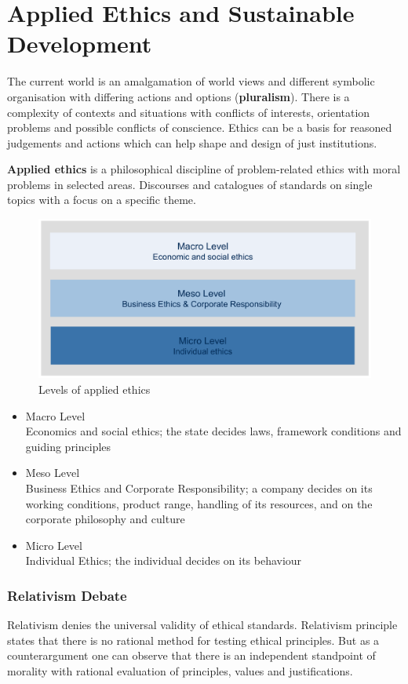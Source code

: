\documentclass[11pt]{article}
\theoremstyle{definition}
\begin{document}
\clearpage
\section{Applied Ethics and Sustainable Development}
The current world is an amalgamation of world views and different symbolic organisation with differing actions and options (\textbf{pluralism}). There is a complexity of contexts and situations with conflicts of interests, orientation problems and possible conflicts of conscience. Ethics can be a basis for reasoned judgements and actions which can help shape and design of just institutions.

\begin{definition}
	\textbf{Applied ethics} is a philosophical discipline of problem-related ethics with moral problems in selected areas. Discourses and catalogues of standards on single topics with a focus on a specific theme.
\end{definition}

\begin{figure}[tbh]
	\centering
	\includegraphics[width=0.6\linewidth]{img/applied_ethics_level}
	\caption{Levels of applied ethics}
	\label{fig:appliedethicslevel}
\end{figure}

\begin{itemize}
	\item Macro Level\\Economics and social ethics; the state decides laws, framework conditions and guiding principles
	\item Meso Level\\Business Ethics and Corporate Responsibility; a company decides on its working conditions, product range, handling of its resources, and on the corporate philosophy and culture
	\item Micro Level\\Individual Ethics; the individual decides on its behaviour
\end{itemize}

\subsubsection{Relativism Debate}
Relativism denies the universal validity of ethical standards. Relativism principle states that there is no rational method for testing ethical principles. But as a counterargument one can observe that there is an independent standpoint of morality with rational evaluation of principles, values and justifications.
\end{document}
